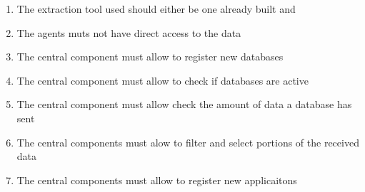 \begin{enumerate}
    \item The extraction tool used should either be one already built and

    \item The agents muts not have direct access to the data


    \item The central component must allow to register new databases


    \item The central component must allow to check if databases are active

        \begin{list}{}{}
            \item
        \end{list}

    \item The central component must allow check the amount of data a database has sent

        \begin{list}{}{}
            \item
        \end{list}

    \item The central components must alow to filter and select portions of the received data

        \begin{list}{}{}
            \item
        \end{list}

    \item The central components must allow to register new applicaitons


\end{enumerate}
